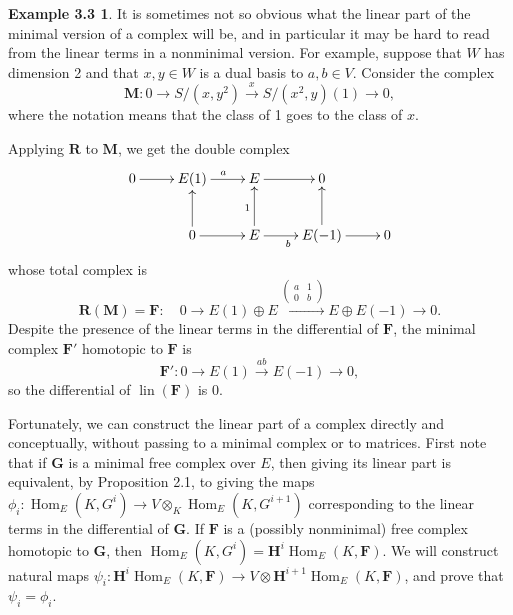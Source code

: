 \documentclass{tran-l}
\newcommand{\myHom}{\operatorname{Hom}}
\newcommand{\lin}{\operatorname{lin}}
\newcommand{\FF}{\mathbf{F}}
\newcommand{\GG}{\mathbf{G}}
\newcommand{\myH}{\mathbf{H}}
\newcommand{\MM}{\mathbf{M}}
\newcommand{\RR}{\mathbf{R}}
\theoremstyle{plain}
\theoremstyle{remark}
\theoremstyle{definition}
\newtheorem*{definition1}{Example 3.3}
\begin{document}
\begin{definition1}
It is sometimes not so obvious what the linear part of the minimal
version of a complex will be, and in particular it may be hard
to read from the linear terms in a nonminimal version. For example,
suppose that $W$  has dimension 2 and that $x,y\in W$ is
a dual basis to $a,b\in V$. Consider the complex
\begin{equation*}\MM : 0\to S/(x,y^{2})\overset {x}{\longrightarrow
}S/(x^{2},y)(1)\to 0,
\end{equation*}
where the notation means that the class of 1 goes to the class of $x$.

Applying $\RR $ to $\MM $, we get the double complex
\begin{equation*}\xy \xymatrix {
0\ar [r]&E(1)\ar [r]^{a}&E\ar [r]&0\\
&0\ar [r]\ar [u]&E\ar [u]^{1}\ar [r]_{b}&E(-1)\ar [u]\ar [r]&0
}
\endxy \end{equation*}
whose total complex is
\begin{equation*}\RR (\MM )=\FF :\quad 0\to E(1)\oplus E
\overset {(\begin{smallmatrix}a&1\\
0&b
\end{smallmatrix})
}{\longrightarrow }E\oplus E(-1)\to 0.
\end{equation*}
Despite the presence of the linear terms
in the differential of $\FF $, the minimal complex
$\FF '$ homotopic
to $\FF $ is
\begin{equation*}\FF ': 0\to E(1)\overset {ab}{\longrightarrow }E(-1)\to 0,
\end{equation*}
so the differential of $\lin (\FF )$ is 0.

Fortunately, we can construct the linear part of a complex directly and
conceptually, without passing to a minimal complex or to matrices.
First note that if $\GG $ is a minimal free complex over $E$,
then giving its linear part is equivalent, by Proposition 2.1,
to giving the maps
$\phi _{i}: \myHom _{E}(K, G^{i}) \to V\otimes _{K} \myHom _{E}(K, G^{i+1})$
corresponding to the
linear terms in the differential of $\GG $.
If $\FF $ is a (possibly nonminimal) free complex homotopic to $\GG $,
then $\myHom _{E}(K, G^{i})=\myH ^{i} \myHom _{E}(K,\FF )$. We will construct
natural maps
$\psi _{i}:\myH ^{i} \myHom _{E}(K,\FF )\to V\otimes \myH ^{i+1}\myHom _{E}(K,\FF )$,
and prove that $\psi _{i}=\phi _{i}$.


\end{definition1}
\end{document}
